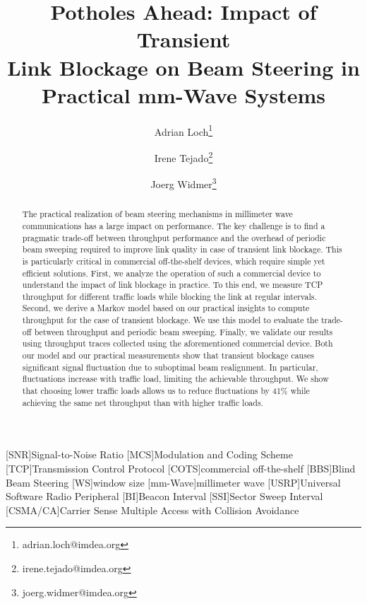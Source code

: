 \documentclass{article}
\begin{document}
\title{Potholes Ahead: Impact of Transient \\ Link Blockage on Beam Steering in \\ Practical mm-Wave Systems}

\author[1]{Adrian Loch\thanks{adrian.loch@imdea.org}}
\author[1, 2]{Irene Tejado\thanks{irene.tejado@imdea.org}}
\author[1]{Joerg Widmer\thanks{joerg.widmer@imdea.org}}

\renewcommand\Authands{ and }
\date{}

\maketitle

[SNR]{Signal-to-Noise Ratio}
[MCS]{Modulation and Coding Scheme}
[TCP]{Transmission Control Protocol}
[COTS]{commercial off-the-shelf}
[BBS]{Blind Beam Steering}
[WS]{window size}
[mm-Wave]{millimeter wave}
[USRP]{Universal Software Radio Peripheral}
[BI]{Beacon Interval}
[SSI]{Sector Sweep Interval}
[CSMA/CA]{Carrier Sense Multiple Access with Collision Avoidance}

\begin{abstract}
The practical realization of beam steering mechanisms in millimeter wave communications has a large impact on performance. The key challenge is to find a pragmatic trade-off between throughput performance and the overhead of periodic beam sweeping required to improve link quality in case of transient link blockage. This is particularly critical in commercial off-the-shelf devices, which require simple yet efficient solutions. First, we analyze the operation of such a commercial device to understand the impact of link blockage in practice. To this end, we measure TCP throughput for different traffic loads while blocking the link at regular intervals. Second, we derive a Markov model based on our practical insights to compute throughput for the case of transient blockage. We use this model to evaluate the trade-off between throughput and periodic beam sweeping. Finally, we validate our results using throughput traces collected using the aforementioned commercial device. Both our model and our practical measurements show that transient blockage causes significant signal fluctuation due to suboptimal beam realignment. In particular, fluctuations increase with traffic load, limiting the achievable throughput. We show that choosing lower traffic loads allows us to reduce fluctuations by 41\% while achieving the same net throughput than with higher traffic loads.
\end{abstract}
\end{document}
